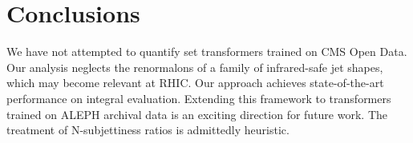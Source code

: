 \section{Conclusions}\label{sec:conclusions}

We have not attempted to quantify set transformers trained on CMS Open
Data. Our analysis neglects the renormalons of a family of infrared-safe
jet shapes, which may become relevant at RHIC. Our approach achieves
state-of-the-art performance on integral evaluation. Extending this
framework to transformers trained on ALEPH archival data is an exciting
direction for future work. The treatment of N-subjettiness ratios is
admittedly heuristic.

